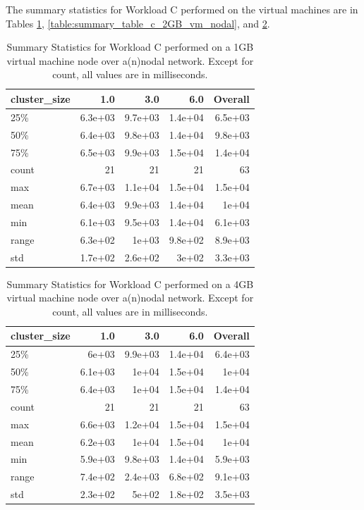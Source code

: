 The summary statistics for Workload C performed on the virtual machines are in Tables \ref{table:summary_table_c_1GB_vm_nodal}, \ref{table:summary_table_c_2GB_vm_nodal}, and \ref{table:summary_table_c_4GB_vm_nodal}.
\begin{table}
\begin{tabular}{lrrrr}
\toprule
cluster\_size &     1.0 &     3.0 &     6.0 &  Overall \\
\midrule
25\%   & 6.3e+03 & 9.7e+03 & 1.4e+04 &  6.5e+03 \\
50\%   & 6.4e+03 & 9.8e+03 & 1.4e+04 &  9.8e+03 \\
75\%   & 6.5e+03 & 9.9e+03 & 1.5e+04 &  1.4e+04 \\
count &      21 &      21 &      21 &       63 \\
max   & 6.7e+03 & 1.1e+04 & 1.5e+04 &  1.5e+04 \\
mean  & 6.4e+03 & 9.9e+03 & 1.4e+04 &    1e+04 \\
min   & 6.1e+03 & 9.5e+03 & 1.4e+04 &  6.1e+03 \\
range & 6.3e+02 &   1e+03 & 9.8e+02 &  8.9e+03 \\
std   & 1.7e+02 & 2.6e+02 &   3e+02 &  3.3e+03 \\
\bottomrule
\end{tabular}
\caption{Summary Statistics for Workload C performed on a 1GB virtual machine node over a(n)nodal network.  Except for count, all values are in milliseconds.}
\label{table:summary_table_c_1GB_vm_nodal}
\end{table}

\begin{table}
\begin{tabular}{lrrrr}
\toprule
cluster\_size &     1.0 &     3.0 &     6.0 &  Overall \\
\midrule
25\%   &   6e+03 & 9.9e+03 & 1.4e+04 &  6.4e+03 \\
50\%   & 6.1e+03 &   1e+04 & 1.5e+04 &    1e+04 \\
75\%   & 6.4e+03 &   1e+04 & 1.5e+04 &  1.4e+04 \\
count &      21 &      21 &      21 &       63 \\
max   & 6.6e+03 & 1.2e+04 & 1.5e+04 &  1.5e+04 \\
mean  & 6.2e+03 &   1e+04 & 1.5e+04 &    1e+04 \\
min   & 5.9e+03 & 9.8e+03 & 1.4e+04 &  5.9e+03 \\
range & 7.4e+02 & 2.4e+03 & 6.8e+02 &  9.1e+03 \\
std   & 2.3e+02 &   5e+02 & 1.8e+02 &  3.5e+03 \\
\bottomrule
\end{tabular}
\caption{Summary Statistics for Workload C performed on a 4GB virtual machine node over a(n)nodal network.  Except for count, all values are in milliseconds.}
\label{table:summary_table_c_4GB_vm_nodal}
\end{table}




